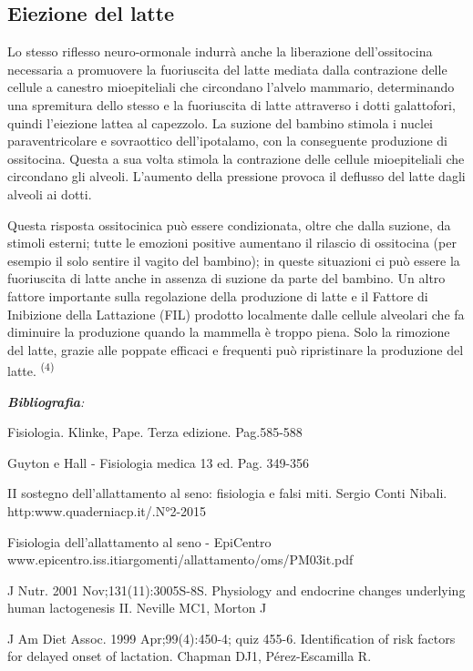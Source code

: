 \documentclass[]{article}
\begin{document}
\hypertarget{eiezione-del-latte}{%
\subsection{Eiezione del latte}\label{eiezione-del-latte}}

Lo stesso riflesso neuro-ormonale indurrà anche la liberazione
dell'ossitocina necessaria a promuovere la fuoriuscita del latte mediata
dalla contrazione delle cellule a canestro mioepiteliali che circondano
l'alvelo mammario, determinando una spremitura dello stesso e la
fuoriuscita di latte attraverso i dotti galattofori, quindi l'eiezione
lattea al capezzolo. La suzione del bambino stimola i nuclei
paraventricolare e sovraottico dell'ipotalamo, con la conseguente
produzione di ossitocina. Questa a sua volta stimola la contrazione
delle cellule mioepiteliali che circondano gli alveoli. L'aumento della
pressione provoca il deflusso del latte dagli alveoli ai dotti.

Questa risposta ossitocinica può essere condizionata, oltre che dalla
suzione, da stimoli esterni; tutte le emozioni positive aumentano il
rilascio di ossitocina (per esempio il solo sentire il vagito del
bambino); in queste situazioni ci può essere la fuoriuscita di latte
anche in assenza di suzione da parte del bambino. Un altro fattore
importante sulla regolazione della produzione di latte e il Fattore di
Inibizione della Lattazione (FIL) prodotto localmente dalle cellule
alveolari che fa diminuire la produzione quando la mammella è troppo
piena. Solo la rimozione del latte, grazie alle poppate efficaci e
frequenti può ripristinare la produzione del latte. \textsuperscript{(4)
}

\emph{\textbf{Bibliografia}: }

Fisiologia. Klinke, Pape. Terza edizione. Pag.585-588

Guyton e Hall - Fisiologia medica 13 ed. Pag. 349-356

II sostegno dell'allattamento al seno: fisiologia e falsi miti. Sergio
Conti Nibali. http:www.quaderniacp.it/.N°2-2015

Fisiologia dell'allattamento al seno - EpiCentro
www.epicentro.iss.itiargomenti/allattamento/oms/PM03it.pdf

J Nutr. 2001 Nov;131(11):3005S-8S. Physiology and endocrine changes
underlying human lactogenesis II. Neville MC1, Morton J

J Am Diet Assoc. 1999 Apr;99(4):450-4; quiz 455-6. Identification of
risk factors for delayed onset of lactation. Chapman DJ1,
Pérez-Escamilla R.
\end{document}
